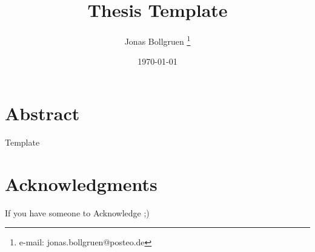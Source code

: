 \documentclass[a4paper,cleardoubleempty,BCOR1cm]{scrbook}
\title{Thesis Template}
\author{Jonas Bollgruen \thanks{e-mail: jonas.bollgruen@posteo.de}}
\date{\today}
\begin{document}


\chapter*{Abstract}
Template

\chapter*{Acknowledgments}
If you have someone to Acknowledge ;)

\tableofcontents




\appendix

%
%

\end{document}
